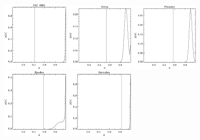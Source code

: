 \clearpage
\begin{figure}
\begin{center}
\includegraphics[width=0.3\textwidth]{figs_groups/fit_ssp_fixpij_ngc1901_alpha.eps}
\includegraphics[width=0.3\textwidth]{figs_groups/fit_ssp_fixpij_sirius_alpha.eps}
\includegraphics[width=0.3\textwidth]{figs_groups/fit_ssp_fixpij_pleiades_alpha.eps}\\
\includegraphics[width=0.3\textwidth]{figs_groups/fit_ssp_fixpij_hyades_alpha.eps}
\includegraphics[width=0.3\textwidth]{figs_groups/fit_ssp_fixpij_hercules_alpha.eps}

\end{center}
\end{figure}
